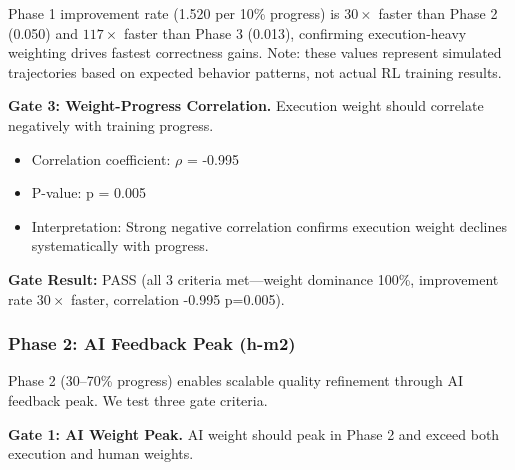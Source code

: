 \begin{table}[htbp]
\centering
{}
\end{table}

Phase 1 improvement rate (1.520 per 10\% progress) is $30\times$ faster than Phase 2 (0.050) and $117\times$ faster than Phase 3 (0.013), confirming execution-heavy weighting drives fastest correctness gains. Note: these values represent simulated trajectories based on expected behavior patterns, not actual RL training results.

\textbf{Gate 3: Weight-Progress Correlation.} Execution weight should correlate negatively with training progress.

\begin{itemize}
\item Correlation coefficient: $\rho$ = -0.995
\item P-value: p = 0.005
\item Interpretation: Strong negative correlation confirms execution weight declines systematically with progress.
\end{itemize}

\textbf{Gate Result:} PASS (all 3 criteria met---weight dominance 100\%, improvement rate $30\times$ faster, correlation -0.995 p=0.005).

\subsubsection{Phase 2: AI Feedback Peak (h-m2)}

Phase 2 (30--70\% progress) enables scalable quality refinement through AI feedback peak. We test three gate criteria.

\textbf{Gate 1: AI Weight Peak.} AI weight should peak in Phase 2 and exceed both execution and human weights.

\begin{table}[htbp]
\centering
{}
\end{table}

